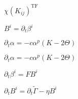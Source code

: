 \documentclass{article}
\begin{document}
$\chi (K_{ij})^{\mathrm{TF}}$
\pagebreak

$B^i = \partial_t \beta^i$
\pagebreak

$\partial_t \alpha = - c \alpha^p(K-2\Theta)$
\pagebreak

$\partial_t \alpha = -c \alpha^p(K-2\Theta)$
\pagebreak

$\partial_t \beta^i = F B^i$
\pagebreak

$\partial_t B^i = \partial_t \tilde \Gamma - \eta B^i$
\pagebreak
\end{document}
